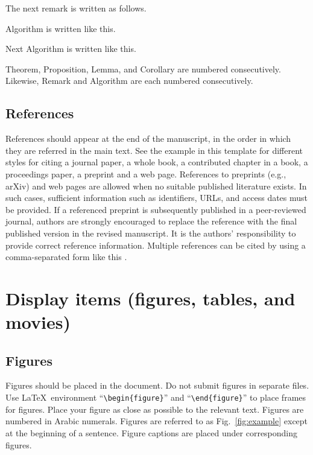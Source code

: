 \documentclass[proceedings]{jasse-modern}%
\begin{document}
\begin{remark}
The next remark is written as follows.
\end{remark}

\begin{algorithm}
Algorithm is written like this.
\end{algorithm}

\begin{algorithm}
Next Algorithm is written like this.
\end{algorithm}

Theorem, Proposition, Lemma, and Corollary are numbered consecutively. Likewise, Remark and Algorithm are each numbered consecutively.

\subsection{References}
References should appear at the end of the manuscript, in the order in which they are referred in the main text.
See the example in this template for different styles for citing a journal paper, a whole book, a contributed chapter in a book, a proceedings paper, a preprint and a web page.
References to preprints (e.g., arXiv) and web pages are allowed when no suitable published literature exists.
In such cases, sufficient information such as identifiers, URLs, and access dates must be provided.
If a referenced preprint is subsequently published in a peer-reviewed journal, authors are strongly encouraged to replace the reference with the final published version in the revised manuscript.
It is the authors' responsibility to provide correct reference information.
Multiple references can be cited by using a comma-separated form like this \cite{journal_paper,journal_paper_example,inproceedings}.

\section{Display items (figures, tables, and movies)}

\subsection{Figures}
Figures should be placed in the document.
Do not submit figures in separate files.
Use \LaTeX\ environment ``\verb|\begin{figure}|'' and ``\verb|\end{figure}|'' to place frames for figures.
Place your figure as close as possible to the relevant text.
Figures are numbered in Arabic numerals.
Figures are referred to as Fig.~\ref{fig:example} except at the beginning of a sentence.
Figure captions are placed under corresponding figures.
\end{document}
